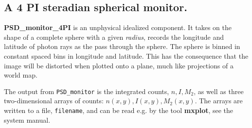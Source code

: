 \subsection*{A 4 PI steradian spherical monitor.}
\textbf{PSD\_monitor\_4PI} is an unphysical idealized component. It takes on the shape of
a complete sphere with a given \textit{radius}, records the longitude and latitude of 
photon rays as the pass through the sphere.
The sphere is binned in constant spaced bins in longitude and latitude. This has the consequence
that the image will be distorted when plotted onto a plane, much like projections of a world map. 

The output from \texttt{PSD\_monitor} is the integrated counts, $n, I, M_2$,
as well as
three two-dimensional arrays of counts: $n(x,y), I(x,y), M_2(x,y)$.
The arrays are written to a file, \verb+filename+, and can be read e.g. by the tool
\textbf{mxplot}, see the system manual.

